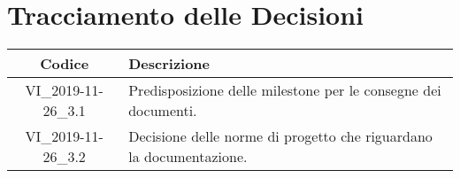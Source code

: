 \section*{Tracciamento delle Decisioni}

\begin{center}
	\begin{longtable}{|c|p{12.25cm}|}
	\hline
	\rowcolor{lighter-grayer}
	\textbf{Codice} & \textbf{Descrizione} \\
	\hline
	\endfirsthead

	\hline
	VI\_2019-11-26\_3.1 & Predisposizione delle milestone per le consegne dei documenti. \\
	VI\_2019-11-26\_3.2 & Decisione delle norme di progetto che riguardano la documentazione. \\
	\hline

	\end{longtable}
\end{center}
